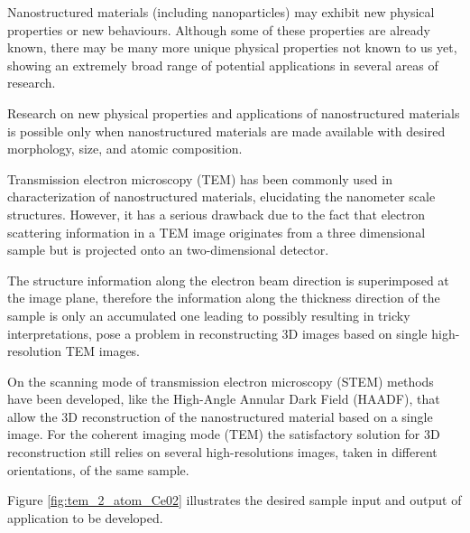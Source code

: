 \documentclass[
  oneside,
  11pt, a4paper,
  footinclude=true,
  headinclude=true,
  cleardoublepage=empty
]{scrbook}
\begin{document}
	
	Nanostructured materials (including nanoparticles) may exhibit new physical properties or new behaviours. Although some of these properties are already known, there may be many more unique physical properties not known to us yet, showing an extremely broad range of potential applications in several areas of research.\par 
	
	Research on new physical properties and applications of nanostructured materials is possible only when nanostructured materials are made available with desired morphology, size, and atomic composition. 
	
	

	
	\par 
    Transmission electron microscopy (TEM) has been commonly used in characterization
of nanostructured materials, elucidating the nanometer scale structures. 
However, it has a serious drawback due to the fact that electron scattering information in a TEM image originates from a three dimensional
sample but is projected onto an two-dimensional detector.\par 
The structure information along the electron beam direction is superimposed
at the image plane, therefore the information along the thickness direction of the sample is only an accumulated one leading to possibly resulting in tricky interpretations, pose a problem in reconstructing 3D images based on single high-resolution TEM images.\par 


 On the scanning mode of transmission electron microscopy (STEM) methods have been developed, like the High-Angle Annular Dark Field (HAADF), that allow the 3D reconstruction of the nanostructured material based on a single image. For the coherent imaging mode (TEM) the satisfactory solution for 3D reconstruction still relies on several high-resolutions images, taken in different orientations, of the same sample.\par 
 Figure \ref{fig:tem_2_atom_Ce02} illustrates the desired sample input and output of application to be developed.
\end{document}
